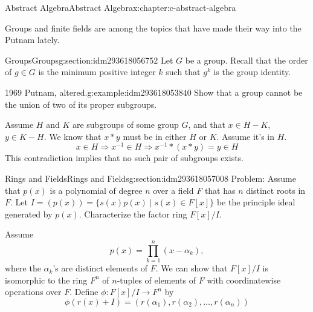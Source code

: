 \documentclass[twoside,10pt,]{book}
\numberwithin{equation}{section}
\begin{document}
\begin{chapterptx}{Abstract Algebra}{}{Abstract Algebra}{}{}{x:chapter:c-abstract-algebra}
\begin{introduction}{}%
Groups and finite fields are among the topics that have made their way into the Putnam lately.%
\end{introduction}%
%
%
\typeout{************************************************}
\typeout{************************************************}
%
\begin{sectionptx}{Groups}{}{Groups}{}{}{g:section:idm293618056752}
Let \(G\) be a group. Recall that the order of  \(g \in G\) is the minimum positive integer \(k\) such that \(g^k\) is the group identity.%
\begin{example}{1969 Putnam, altered.}{g:example:idm293618053840}%
Show that a group cannot be the union of two of its proper subgroups.%
\par
Assume \(H\) and \(K\) are subgroups of some group \(G\), and that \(x \in H-K\), \(y \in K-H\).  We know that \(x*y\) must be in either \(H\) or \(K\).  Assume it's in \(H\).%
\begin{equation*}
x \in H \Rightarrow x^{-1} \in H \Rightarrow x^{-1}*(x*y) = y \in H
\end{equation*}
This contradiction implies that no such pair of subgroups exists.%
\end{example}
\end{sectionptx}
%
%
\typeout{************************************************}
\typeout{************************************************}
%
\begin{sectionptx}{Rings and Fields}{}{Rings and Fields}{}{}{g:section:idm293618057008}
Problem: Assume that \(p(x)\) is a polynomial of degree \(n\) over a field \(F\) that has \(n\) distinct roots in \(F\). Let \(I=(p(x)) = \{s(x)p(x) \mid s(x)\in F[x]\}\) be the principle ideal generated by \(p(x)\).  Characterize the factor ring \(F[x]/I\).%
\par
Assume%
\begin{equation*}
p(x)= \prod_{k=1}^n (x-\alpha_k),
\end{equation*}
where the \(\alpha_k\)'s are distinct elements of \(F\). We can show that \(F[x]/I\) is isomorphic to the ring \(F^n\) of \(n\)-tuples of elements of \(F\) with coordinatewise operations over \(F\).  Define \(\phi:F[x]/I \rightarrow F^n\) by%
\begin{equation*}
\phi(r(x)+I)=(r(\alpha_1),r(\alpha_2),\dots,r(\alpha_n))

\end{equation*}
\end{sectionptx}
\end{chapterptx}
\end{document}
